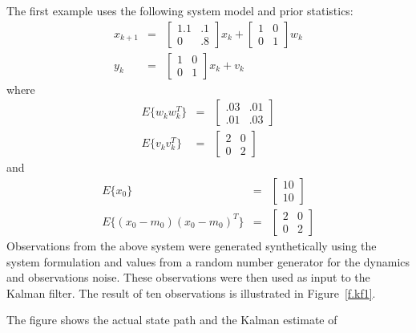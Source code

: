 	The first example uses the following system model and prior 
statistics:
%
\begin{eqnarray}
x_{k+1}&=&\left[\begin{array}{cc}
              1.1 & .1\\
              0   & .8\end{array}\right]x_k+
         \left[\begin{array}{cc}
              1 & 0\\
              0 & 1\end{array}\right]w_k\nonumber\\
y_k&=&\left[\begin{array}{cc}
              1 & 0\\
              0 & 1\end{array}\right]x_k+v_k\nonumber
\end{eqnarray}
%
where
%
\begin{eqnarray}
E\{w_kw_k^T\}&=&\left[\begin{array}{cc}
              .03 & .01\\
              .01 & .03\end{array}\right]\nonumber\\
E\{v_kv_k^T\}&=&\left[\begin{array}{cc}
              2 & 0\\
              0 & 2\end{array}\right]\nonumber
\end{eqnarray}
%
and
%
\begin{eqnarray}
E\{x_0\}&=&\left[\begin{array}{c}
              10\\
              10\end{array}\right]\nonumber\\
E\{(x_0-m_0)(x_0-m_0)^T\}&=&\left[\begin{array}{cc}
              2 & 0\\
              0 & 2\end{array}\right]\nonumber
\end{eqnarray}
%
Observations from the above system were generated synthetically
using the system formulation and values from a random number generator
for the dynamics and observations noise.  These observations were then
used as input to the Kalman filter.  The result of ten observations is
illustrated in Figure~\ref{f.kf1}.
%

%
The figure shows the actual state path and the Kalman estimate of
